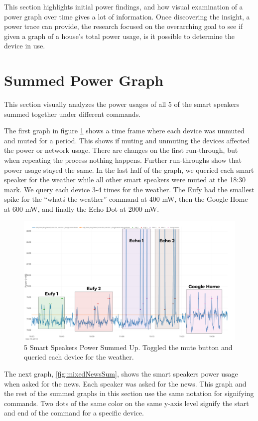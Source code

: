 This section highlights initial power findings, and how visual examination of a power graph over time gives a lot of information. Once discovering the insight, a power trace can provide, the research focused on the overarching goal to see if given a graph of a house's total power usage, is it possible to determine the device in use.

\section{Summed Power Graph}
\label{sumPowerGraph}
This section visually analyzes the power usages of all 5 of the smart speakers summed together under different commands.

The first graph in figure \ref{fig:weatherSum} shows a time frame where each device was unmuted and muted for a period. This shows if muting and unmuting the devices affected the power or network usage. There are changes on the first run-through, but when repeating the process nothing happens. Further run-throughs show that power usage stayed the same. In the last half of the graph, we queried each smart speaker for the weather while all other smart speakers were muted at the 18:30 mark. We query each device 3-4 times for the weather. The Eufy had the smallest spike for the ``what\'s the weather'' command at 400 mW, then the Google Home at 600 mW, and finally the Echo Dot at 2000 mW.

\begin{figure}[H]
  \centering
  \includegraphics[width=1\textwidth]{figures/weatherSum.png}
  \caption{5 Smart Speakers Power Summed Up. Toggled the mute button and queried each device for the weather.}
  \label{fig:weatherSum}
\end{figure}

The next graph, \ref{fig:mixedNewsSum}, shows the smart speakers power usage when asked for the news. Each speaker was asked for the news. This graph and the rest of the summed graphs in this section use the same notation for signifying commands. Two dots of the same color on the same y-axis level signify the start and end of the command for a specific device.

